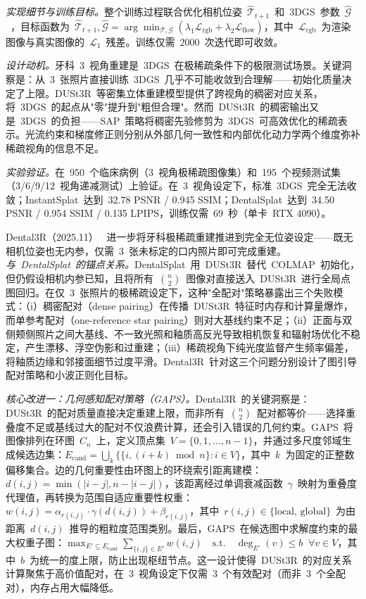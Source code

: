 \textit{实现细节与训练目标。}整个训练过程联合优化相机位姿~$\hat{\mathcal{T}}_{t+1}$~和~3DGS~参数~$\hat{\mathcal{G}}$~，目标函数为~$\hat{\mathcal{T}}_{t+1}, \hat{\mathcal{G}} = \arg\min_{\mathcal{T}, \mathcal{G}} (\lambda_1 \mathcal{L}_{\text{rgb}} + \lambda_2 \mathcal{L}_{\text{flow}})$，其中~$\mathcal{L}_{\text{rgb}}$~为渲染图像与真实图像的~$\mathcal{L}_1$~残差。训练仅需~2000~次迭代即可收敛。

\textit{设计动机。}牙科~3~视角重建是~3DGS~在极稀疏条件下的极限测试场景。关键洞察是：从~3~张照片直接训练~3DGS~几乎不可能收敛到合理解——初始化质量决定了上限。DUSt3R~等密集立体重建模型提供了跨视角的稠密对应关系，将~3DGS~的起点从"零"提升到"粗但合理"。然而~DUSt3R~的稠密输出又是~3DGS~的负担——SAP~策略将稠密先验修剪为~3DGS~可高效优化的稀疏表示。光流约束和梯度修正则分别从外部几何一致性和内部优化动力学两个维度弥补稀疏视角的信息不足。

\textit{实验验证。}在~950~个临床病例（3~视角极稀疏图像集）和~195~个视频测试集（3/6/9/12~视角递减测试）上验证。在~3~视角设定下，标准~3DGS~完全无法收敛；InstantSplat~达到~32.78 PSNR / 0.945 SSIM；DentalSplat~达到~34.50 PSNR / 0.954 SSIM / 0.135 LPIPS，训练仅需~69~秒（单卡~RTX 4090）。

Dental3R（2025.11）~\cite{2511_14315} 进一步将牙科极稀疏重建推进到完全无位姿设定——既无相机位姿也无内参，仅需~3~张未标定的口内照片即可完成重建。\textit{与~DentalSplat~的锚点关系。}DentalSplat~用~DUSt3R~替代~COLMAP~初始化，但仍假设相机内参已知，且将所有~$\binom{n}{2}$~图像对直接送入~DUSt3R~进行全局点图回归。在仅~3~张照片的极稀疏设定下，这种"全配对"策略暴露出三个失败模式：（i）稠密配对（dense pairing）在传播~DUSt3R~特征时内存和计算量爆炸，而单参考配对（one-reference star pairing）则对大基线约束不足；（ii）正面与双侧颊侧照片之间大基线、不一致光照和釉质高反光导致相机恢复和辐射场优化不稳定，产生漂移、浮空伪影和过重建；（iii）稀疏视角下纯光度监督产生频率偏差，将釉质边缘和邻接面细节过度平滑。Dental3R~针对这三个问题分别设计了图引导配对策略和小波正则化目标。

\textit{核心改进一：几何感知配对策略（GAPS）。}Dental3R~的关键洞察是：DUSt3R~的配对质量直接决定重建上限，而非所有~$\binom{n}{2}$~配对都等价——选择重叠度不足或基线过大的配对不仅浪费计算，还会引入错误的几何约束。GAPS~将图像排列在环图~$C_n$~上，定义顶点集~$V = \{0, 1, \ldots, n-1\}$，并通过多尺度邻域生成候选边集：$E_{\text{cand}} = \bigcup_k \{\{i, (i+k) \bmod n\} : i \in V\}$，其中~$k$~为固定的正整数偏移集合。边的几何重要性由环图上的环绕索引距离建模：$d(i,j) = \min(|i-j|, n - |i-j|)$，该距离经过单调衰减函数~$\gamma$~映射为重叠度代理值，再转换为范围自适应重要性权重：$w(i,j) = \alpha_{r(i,j)} \cdot \gamma(d(i,j)) + \beta_{r(i,j)}$，其中~$r(i,j) \in \{\text{local, global}\}$~为由距离~$d(i,j)$~推导的粗粒度范围类别。最后，GAPS~在候选图中求解度约束的最大权重子图：$\max_{E' \subseteq E_{\text{cand}}} \sum_{\{i,j\} \in E'} w(i,j) \quad \text{s.t.} \quad \deg_{E'}(v) \leq b \;\; \forall v \in V$，其中~$b$~为统一的度上限，防止出现枢纽节点。这一设计使得~DUSt3R~的对应关系计算聚焦于高价值配对，在~3~视角设定下仅需~3~个有效配对（而非~3~个全配对），内存占用大幅降低。

